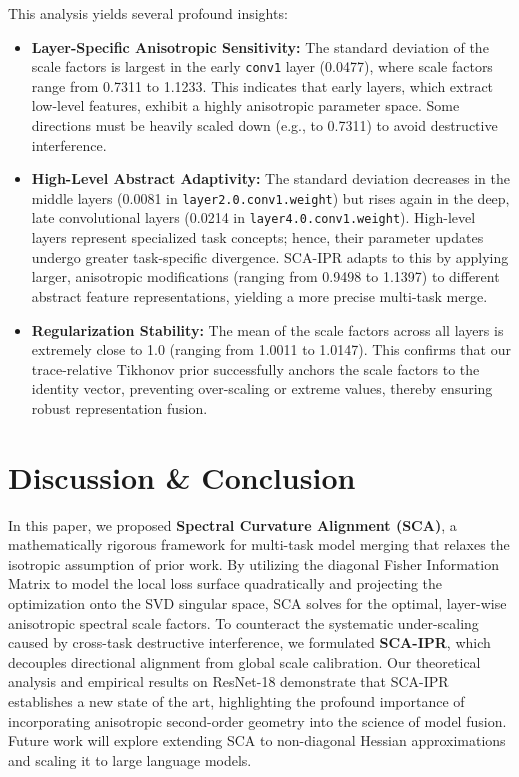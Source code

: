 \documentclass{article}
\theoremstyle{plain}
\theoremstyle{definition}
\theoremstyle{remark}
\begin{document}
This analysis yields several profound insights:
\begin{itemize}
    \item \textbf{Layer-Specific Anisotropic Sensitivity:} The standard deviation of the scale factors is largest in the early \texttt{conv1} layer (0.0477), where scale factors range from 0.7311 to 1.1233. This indicates that early layers, which extract low-level features, exhibit a highly anisotropic parameter space. Some directions must be heavily scaled down (e.g., to 0.7311) to avoid destructive interference.
    \item \textbf{High-Level Abstract Adaptivity:} The standard deviation decreases in the middle layers (0.0081 in \texttt{layer2.0.conv1.weight}) but rises again in the deep, late convolutional layers (0.0214 in \texttt{layer4.0.conv1.weight}). High-level layers represent specialized task concepts; hence, their parameter updates undergo greater task-specific divergence. SCA-IPR adapts to this by applying larger, anisotropic modifications (ranging from 0.9498 to 1.1397) to different abstract feature representations, yielding a more precise multi-task merge.
    \item \textbf{Regularization Stability:} The mean of the scale factors across all layers is extremely close to 1.0 (ranging from 1.0011 to 1.0147). This confirms that our trace-relative Tikhonov prior successfully anchors the scale factors to the identity vector, preventing over-scaling or extreme values, thereby ensuring robust representation fusion.
\end{itemize}

\section{Discussion \& Conclusion}
\label{submission:conclusion}

In this paper, we proposed \textbf{Spectral Curvature Alignment (SCA)}, a mathematically rigorous framework for multi-task model merging that relaxes the isotropic assumption of prior work. 
By utilizing the diagonal Fisher Information Matrix to model the local loss surface quadratically and projecting the optimization onto the SVD singular space, SCA solves for the optimal, layer-wise anisotropic spectral scale factors. 
To counteract the systematic under-scaling caused by cross-task destructive interference, we formulated \textbf{SCA-IPR}, which decouples directional alignment from global scale calibration. 
Our theoretical analysis and empirical results on ResNet-18 demonstrate that SCA-IPR establishes a new state of the art, highlighting the profound importance of incorporating anisotropic second-order geometry into the science of model fusion. 
Future work will explore extending SCA to non-diagonal Hessian approximations and scaling it to large language models.
\end{document}
